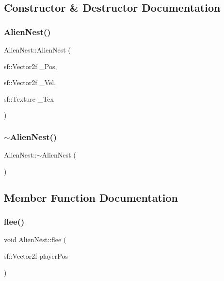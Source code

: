 \subsection{Constructor \& Destructor Documentation}
\mbox{\label{class_alien_nest_ae5468acc196e21772de57cc786bc8922}} 
\subsubsection{\texorpdfstring{Alien\+Nest()}{AlienNest()}}
{\footnotesize\ttfamily Alien\+Nest\+::\+Alien\+Nest (\begin{DoxyParamCaption}\item[{sf\+::\+Vector2f}]{\+\_\+\+Pos,  }\item[{sf\+::\+Vector2f}]{\+\_\+\+Vel,  }\item[{sf\+::\+Texture}]{\+\_\+\+Tex }\end{DoxyParamCaption})}

\mbox{\label{class_alien_nest_adf76d39d4b159b48b685e28b48e65af4}} 
\subsubsection{\texorpdfstring{$\sim$\+Alien\+Nest()}{~AlienNest()}}
{\footnotesize\ttfamily Alien\+Nest\+::$\sim$\+Alien\+Nest (\begin{DoxyParamCaption}{ }\end{DoxyParamCaption})}



\subsection{Member Function Documentation}
\mbox{\label{class_alien_nest_a79b79e01b2c2c191a62f6522e62e7093}} 
\subsubsection{\texorpdfstring{flee()}{flee()}}
{\footnotesize\ttfamily void Alien\+Nest\+::flee (\begin{DoxyParamCaption}\item[{sf\+::\+Vector2f}]{player\+Pos }\end{DoxyParamCaption})}

